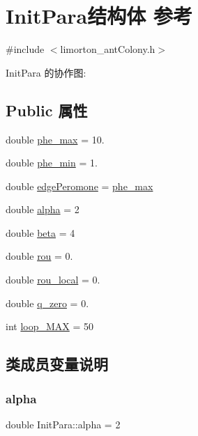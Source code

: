 \hypertarget{struct_init_para}{}\section{Init\+Para结构体 参考}
\label{struct_init_para}


{\ttfamily \#include $<$limorton\+\_\+ant\+Colony.\+h$>$}



Init\+Para 的协作图\+:
\subsection*{Public 属性}
\begin{DoxyCompactItemize}
\item 
double \hyperlink{struct_init_para_a8aee8d4a56f62884f0f559908a29bcb5}{phe\+\_\+max} = 10.
\item 
double \hyperlink{struct_init_para_a9a83e58220ddb09e157a8b386071de5c}{phe\+\_\+min} = 1.
\item 
double \hyperlink{struct_init_para_af78e62344cc2a45f6cf404ee8e84e6a9}{edge\+Peromone} = \hyperlink{struct_init_para_a8aee8d4a56f62884f0f559908a29bcb5}{phe\+\_\+max}
\item 
double \hyperlink{struct_init_para_a3324b5c0ed116e5f66978b63a88af30f}{alpha} = 2
\item 
double \hyperlink{struct_init_para_a06bb2f63d29c70cbff1d6bbf341b58e9}{beta} = 4
\item 
double \hyperlink{struct_init_para_a9c8024d7e8d60ffef01ade661bf0ec6a}{rou} = 0.
\item 
double \hyperlink{struct_init_para_a2d2de89821ca5c3f3d26a9a512422dbf}{rou\+\_\+local} = 0.
\item 
double \hyperlink{struct_init_para_a83780df87370e4fa2d5f048d0281c990}{q\+\_\+zero} = 0.
\item 
int \hyperlink{struct_init_para_afb0d2b3b844a6334221af30e1de48a7d}{loop\+\_\+\+M\+AX} = 50
\end{DoxyCompactItemize}


\subsection{类成员变量说明}
\mbox{\label{struct_init_para_a3324b5c0ed116e5f66978b63a88af30f}} 
\subsubsection{\texorpdfstring{alpha}{alpha}}
{\footnotesize\ttfamily double Init\+Para\+::alpha = 2}

